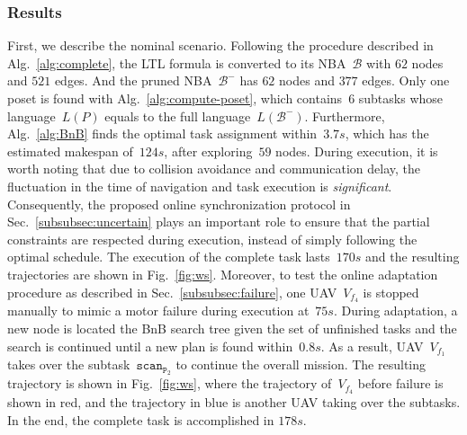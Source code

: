 \subsubsection{Results}\label{subsubsec:hw-results}
First, we describe the nominal scenario.
Following the procedure described in Alg.~\ref{alg:complete},
the LTL formula is converted to its NBA~$\mathcal{B}$ with $62$ nodes and $521$ edges.
And the pruned NBA~$\mathcal{B}^-$ has $62$ nodes and $377$ edges.
Only one poset is found with Alg.~\ref{alg:compute-poset},
which contains~$6$ subtasks whose language~$L(P)$ equals to the full language~$L(\mathcal{B}^-)$.
Furthermore, Alg.~\ref{alg:BnB} finds the
optimal task assignment within~$3.7s$,
which has the estimated makespan of~$124s$, after exploring~$59$ nodes.
During execution, it is worth noting that due to collision avoidance and communication delay,
the fluctuation in the time of navigation and task execution is \emph{significant}.
Consequently, the proposed online synchronization protocol in Sec.~\ref{subsubsec:uncertain}
plays an important role to ensure that the partial constraints
are respected during execution,
instead of simply following the optimal schedule.
The execution of the complete task lasts~$170s$ and
the resulting trajectories are shown in Fig.~\ref{fig:ws}.
Moreover, to test the online adaptation procedure
as described in Sec.~\ref{subsubsec:failure},
one UAV~$V_{f_4}$ is stopped manually to mimic a motor failure during execution at~$75s$.
During adaptation, a new node is located the BnB search tree
given the set of unfinished tasks
and the search is continued until a new plan is found within~$0.8s$.
As a result, UAV~$V_{f_1}$ takes over the subtask~$\texttt{scan}_{\texttt{P}_2}$
to continue the overall mission.
The resulting trajectory is shown in Fig.~\ref{fig:ws},
where the trajectory of~$V_{f_4}$ before failure is shown in red,
and the trajectory in blue is another UAV taking over the subtasks.
In the end, the complete task is accomplished in $178s$.

